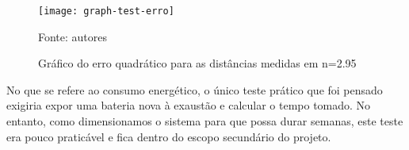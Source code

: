 \begin{figure}[ht]
  \centering
    \caption{Gráfico do erro quadrático para as distâncias medidas em n=2.95}
    \texttt{[image: graph-test-erro]}
   \centerline{\small{Fonte: autores}}
\end{figure}

No que se refere ao consumo energético, o único teste prático que foi pensado exigiria expor uma bateria nova à exaustão e calcular o tempo tomado. No entanto, como dimensionamos o sistema para que possa durar semanas, este teste era pouco praticável e fica dentro do escopo secundário do projeto.
